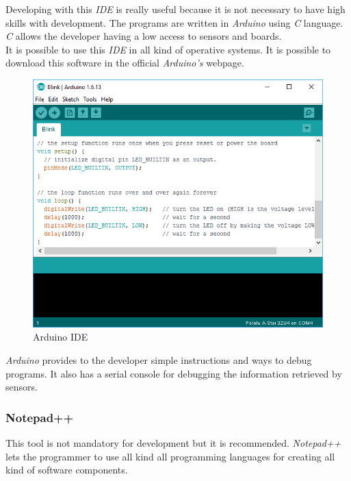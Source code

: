 Developing with this \textit{IDE} is really useful because it is not necessary to have high skills with development. The programs are written in \textit{Arduino} using \textit{C} language. \textit{C} allows the developer having a low access to sensors and boards.\\

It is possible to use this \textit{IDE} in all kind of operative systems. It is possible to download this software in the official \textit{Arduino's} webpage.\\

\begin{figure}[H]
\begin{centering}
\includegraphics[scale=0.7]{IMGS/ARDUINO_IDE.png}
\caption{Arduino IDE \label{ARDUINO_IDE}}
\end{centering}
\end{figure}

\textit{Arduino} provides to the developer simple instructions and ways to debug programs. It also has a serial console for debugging the information retrieved by sensors.

\subsubsection{Notepad++}

This tool is not mandatory for development but it is recommended. \textit{Notepad++} lets the programmer to use all kind all programming languages for creating all kind of software components.


